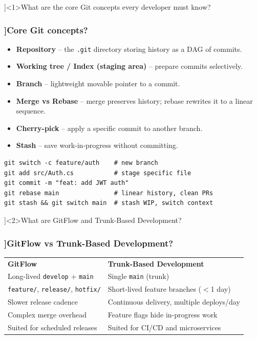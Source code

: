 
\QuestionSlide[\CategoryBadge[ToolingColor!20]{Tooling \& Agile}]<1>{What are the core Git concepts every developer must know?}

\begin{frame}[fragile]
  \frametitle{\AnswerTitle[\CategoryBadge[ToolingColor!20]{Tooling \& Agile}]{Core Git concepts?}}

  {\footnotesize
  \begin{itemize}
    \item \textbf{Repository} – the \texttt{.git} directory storing history as a DAG of commits.
    \item \textbf{Working tree / Index (staging area)} – prepare commits selectively.
    \item \textbf{Branch} – lightweight movable pointer to a commit.
    \item \textbf{Merge vs Rebase} – merge preserves history; rebase rewrites it to a linear sequence.
    \item \textbf{Cherry-pick} – apply a specific commit to another branch.
    \item \textbf{Stash} – save work-in-progress without committing.
  \end{itemize}
  }

  \begin{verbatim}
git switch -c feature/auth    # new branch
git add src/Auth.cs           # stage specific file
git commit -m "feat: add JWT auth"
git rebase main               # linear history, clean PRs
git stash && git switch main  # stash WIP, switch context
  \end{verbatim}
\end{frame}

\QuestionSlide[\CategoryBadge[ToolingColor!20]{Tooling \& Agile}]<2>{What are GitFlow and Trunk-Based Development?}

\begin{frame}[fragile]
  \frametitle{\AnswerTitle[\CategoryBadge[ToolingColor!20]{Tooling \& Agile}]{GitFlow vs Trunk-Based Development?}}

  {\footnotesize
  \begin{tabular}{ll}
    \textbf{GitFlow} & \textbf{Trunk-Based Development} \\
    Long-lived \texttt{develop} + \texttt{main} & Single \texttt{main} (trunk) \\
    \texttt{feature/}, \texttt{release/}, \texttt{hotfix/} & Short-lived feature branches ($<$1 day) \\
    Slower release cadence & Continuous delivery, multiple deploys/day \\
    Complex merge overhead & Feature flags hide in-progress work \\
    Suited for scheduled releases & Suited for CI/CD and microservices \\
  \end{tabular}
  }
\end{frame}

